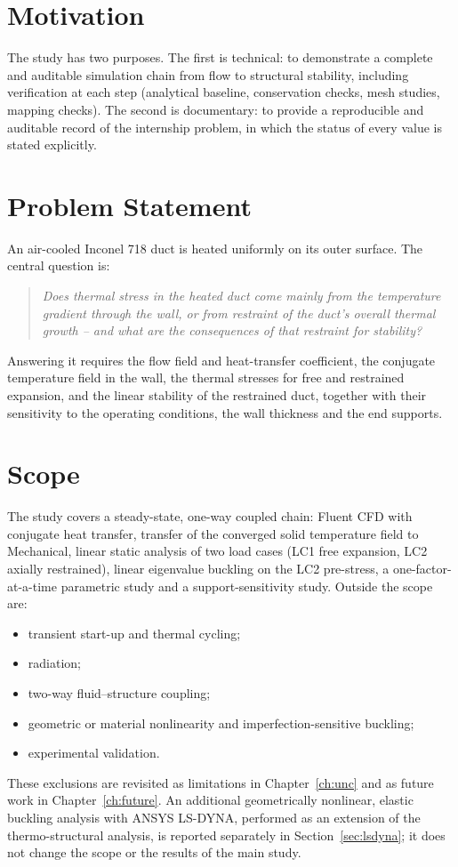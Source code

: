 \section{Motivation}
The study has two purposes. The first is technical: to demonstrate a complete and auditable simulation chain from flow to
structural stability, including verification at each step (analytical baseline, conservation checks, mesh studies, mapping checks).
The second is documentary: to provide a reproducible and auditable record of the internship problem, in which the status of every
value is stated explicitly.

\section{Problem Statement}
An air-cooled Inconel 718 duct is heated uniformly on its outer surface. The central question is:
\begin{quote}
\emph{Does thermal stress in the heated duct come mainly from the temperature gradient through the wall, or from restraint of the
duct's overall thermal growth -- and what are the consequences of that restraint for stability?}
\end{quote}
Answering it requires the flow field and heat-transfer coefficient, the conjugate temperature field in the wall, the thermal stresses for
free and restrained expansion, and the linear stability of the restrained duct, together with their sensitivity to the operating
conditions, the wall thickness and the end supports.

\section{Scope}
The study covers a steady-state, one-way coupled chain: Fluent CFD with conjugate heat transfer, transfer of the converged solid
temperature field to Mechanical, linear static analysis of two load cases (LC1 free expansion, LC2 axially restrained), linear
eigenvalue buckling on the LC2 pre-stress, a one-factor-at-a-time parametric study and a support-sensitivity study. Outside the scope are:
\begin{itemize}
\item transient start-up and thermal cycling;
\item radiation;
\item two-way fluid--structure coupling;
\item geometric or material nonlinearity and imperfection-sensitive buckling;
\item experimental validation.
\end{itemize}
These exclusions are revisited as limitations in Chapter~\ref{ch:unc} and as future work in Chapter~\ref{ch:future}. An additional
geometrically nonlinear, elastic buckling analysis with ANSYS LS-DYNA, performed as an extension of the thermo-structural analysis, is
reported separately in Section~\ref{sec:lsdyna}; it does not change the scope or the results of the main study.


